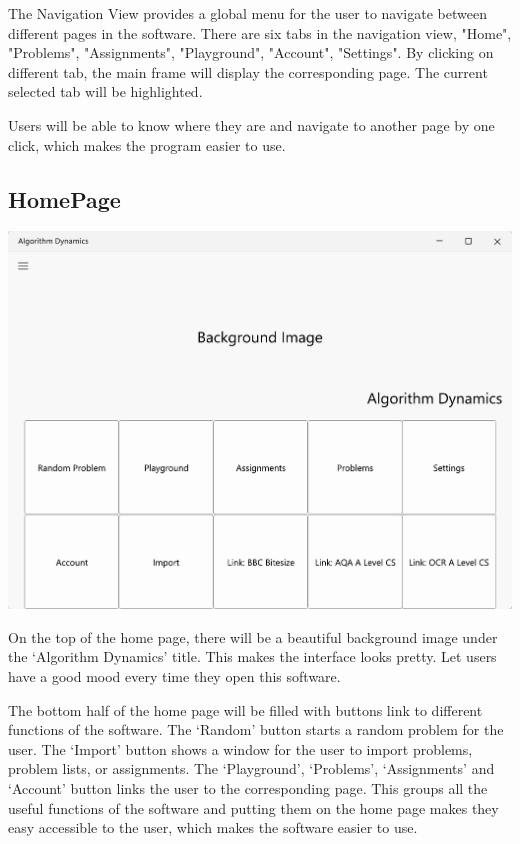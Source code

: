 \documentclass[a4paper]{report}
\begin{document}
The Navigation View provides a global menu for the user to navigate between different pages in the software. There are six tabs in the navigation view, "Home", "Problems", "Assignments", "Playground", "Account", "Settings". By clicking on different tab, the main frame will display the corresponding page. The current selected tab will be highlighted.

Users will be able to know where they are and navigate to another page by one click, which makes the program easier to use.

\subsection{HomePage}

\includegraphics[width=\textwidth, height=\textheight, keepaspectratio]{HomePage-Design}

On the top of the home page, there will be a beautiful background image under the `Algorithm Dynamics' title. This makes the interface looks pretty. Let users have a good mood every time they open this software.

The bottom half of the home page will be filled with buttons link to different functions of the software. The `Random' button starts a random problem for the user. The `Import' button shows a window for the user to import problems, problem lists, or assignments. The `Playground', `Problems', `Assignments' and `Account' button links the user to the corresponding page. This groups all the useful functions of the software and putting them on the home page makes they easy accessible to the user, which makes the software easier to use.
\end{document}
